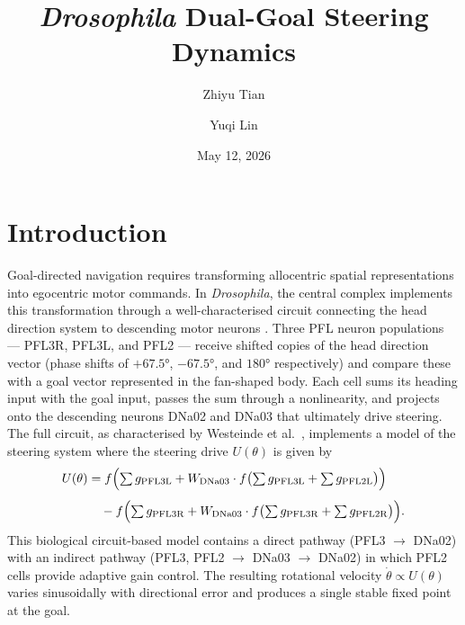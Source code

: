 \documentclass[11pt, a4paper]{article}
\title{\textit{Drosophila} Dual-Goal Steering Dynamics}
\author{Zhiyu Tian \and Yuqi Lin}
\date{May 12, 2026}
\begin{document}
\maketitle

\section{Introduction}
\label{sec:intro}

Goal-directed navigation requires transforming allocentric spatial
representations into egocentric motor commands.  In \textit{Drosophila}, the
central complex implements this transformation through a well-characterised
circuit connecting the head direction system to descending motor neurons
\cite{westeinde2024}.  Three PFL neuron populations --- PFL3R, PFL3L, and PFL2
--- receive shifted copies of the head direction vector (phase shifts of
$+67.5°$, $-67.5°$, and $180°$ respectively) and compare these with a goal
vector represented in the fan-shaped body.  Each cell sums its heading input
with the goal input, passes the sum through a nonlinearity, and projects onto
the descending neurons DNa02 and DNa03 that ultimately drive steering.  The
full circuit, as characterised by Westeinde et al.\ \cite{westeinde2024},
implements a model of the steering system where the steering drive $U(\theta)$
is given by
%
\begin{equation}
\label{eq:steering}
\begin{aligned}
U(\theta) &=
  f\Bigl(
    \textstyle\sum g_{\mathrm{PFL3L}}
    + W_{\mathrm{DNa03}} \cdot
      f\bigl(\textstyle\sum g_{\mathrm{PFL3L}}
               + \textstyle\sum g_{\mathrm{PFL2L}}\bigr)
  \Bigr) \\[4pt]
&\quad -
  f\Bigl(
    \textstyle\sum g_{\mathrm{PFL3R}}
    + W_{\mathrm{DNa03}} \cdot
      f\bigl(\textstyle\sum g_{\mathrm{PFL3R}}
               + \textstyle\sum g_{\mathrm{PFL2R}}\bigr)
  \Bigr).
\end{aligned}
\end{equation}
%
This biological circuit-based model contains a direct pathway
(PFL3 $\to$ DNa02) with an indirect pathway (PFL3, PFL2 $\to$ DNa03 $\to$
DNa02) in which PFL2 cells provide adaptive gain control.  The resulting
rotational velocity $\dot\theta \propto U(\theta)$ varies sinusoidally with
directional error and produces a single stable fixed point at the goal.
\end{document}
